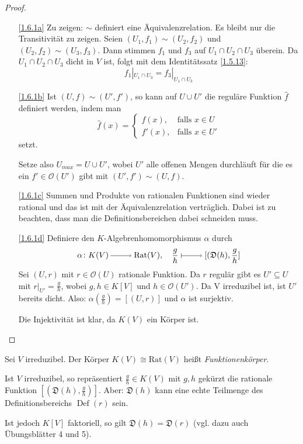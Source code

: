\documentclass[a4paper,12pt]{scrbook}
\newtheorem{proof}{Beweis}
\def\O{\mathcal{O}}
\newcommand{\D}{\mathfrak{D}}
\newcommand{\Rat}{\mathrm{Rat}}
\newcommand{\Def}{\operatorname{Def}}
\newcommand{\restrict}[1]{|_{#1}}
\newcommand{\ra}{\raisebox{-1pt}{\tikz{\draw[thin,shorten >=3pt, ->] (0,0) node{\hspace*{-2pt}} -- node{} (1,0);}}\penalty1000\relax}
\renewcommand{\mapsto}{\raisebox{-1pt}{\tikz{\draw[thin,shorten >=3pt, |->] (0,0) node{\hspace*{0pt}} -- node{} (1,0);}}\penalty1000\relax}
\newcommand{\dach}{\widehat}
\begin{document}
\begin{proof}
\begin{enumerate}
\item[\ref{1.6.1a}] Zu zeigen: $\sim$ definiert eine Äquivalenzrelation. Es bleibt nur die Transitivität zu zeigen.
Seien $(U_1,f_1)\sim (U_2,f_2)$ und $(U_2,f_2)\sim (U_3,f_3)$. Dann stimmen $f_1$ und $f_3$ auf $U_1\cap U_2\cap U_3$ überein. Da $U_1\cap U_2\cap U_3$ dicht in $V$ ist, folgt mit dem Identitätssatz \cref{1.5.13}:
\[f_1\restrict{U_1\cap U_3}=f_3\restrict{U_1\cap U_3}\]
\item[\ref{1.6.1b}] Ist $(U,f)\sim(U',f')$, so kann auf $U\cup U'$ die reguläre Funktion $\dach{f}$ definiert werden, indem man 
\[\dach{f}(x)=\begin{cases} f(x),&\text{falls } x\in U \\ f'(x),&\text{falls } x\in U'\end{cases}\] setzt.

Setze also $U_{max}=U\cup U'$, wobei $U'$ alle offenen Mengen durchläuft für die es ein $f'\in \O(U')$ gibt mit $(U',f')\sim (U,f)$.
\item[\ref{1.6.1c}] Summen und Produkte von rationalen Funktionen sind wieder rational und das ist mit der Äquivalenzrelation verträglich. Dabei ist zu beachten, dass man die Definitionsbereichen dabei schneiden muss.
\item[\ref{1.6.1d}] Definiere den $K$-Algebrenhomomorphismus $\alpha$ durch
\[\alpha\colon K(V)\ra \Rat(V), \quad \frac{g}{h}\mapsto [(\D(h),\frac{g}{h}]\] 
Sei $(U,r)$ mit $r\in \O(U)$ rationale Funktion. Da $r$ regulär gibt es $U'\subseteq U$ mit $r\restrict{U'}=\frac{g}{h}$, wobei $g,h \in K[V]$ und $h\in \O(U')$. Da V irreduzibel ist, ist $U'$ bereits dicht. Also: $\alpha(\frac{g}{h})=[(U,r)]$ und $\alpha$ ist surjektiv.

Die Injektivität ist klar, da $K(V)$ ein Körper ist.
\end{enumerate}
\end{proof}

\begin{dfn}\label{1.6.2}
Sei $V$ irreduzibel. Der Körper $K(V)\cong \Rat(V)$ heißt \emph{Funktionenkörper}.
\end{dfn}

\begin{w}
Ist $V$ irreduzibel, so repräsentiert $\frac{g}{h} \in K(V)$ mit $g,h$ gekürzt die rationale Funktion $[(\D(h),\frac{g}{h})]$.
%
Aber: $\D(h)$ kann eine echte Teilmenge des Definitionsbereichs $\Def(r)$ sein. 

Ist jedoch $K[V]$ faktoriell, so gilt $\D(h)=\D(r)$ (vgl. dazu auch Übungsblätter 4 und 5).
\end{w}
\end{document}
